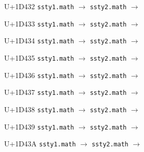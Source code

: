 \documentclass{article}
\begin{document}
\begin{substitutions}
\goodbreak

U+1D432  \linebreak
    \texttt{ssty1.math} $\to$  \linebreak
    \texttt{ssty2.math} $\to$  

\goodbreak

U+1D433  \linebreak
    \texttt{ssty1.math} $\to$  \linebreak
    \texttt{ssty2.math} $\to$  

\goodbreak

U+1D434  \linebreak
    \texttt{ssty1.math} $\to$  \linebreak
    \texttt{ssty2.math} $\to$  

\goodbreak

U+1D435  \linebreak
    \texttt{ssty1.math} $\to$  \linebreak
    \texttt{ssty2.math} $\to$  

\goodbreak

U+1D436  \linebreak
    \texttt{ssty1.math} $\to$  \linebreak
    \texttt{ssty2.math} $\to$  

\goodbreak

U+1D437  \linebreak
    \texttt{ssty1.math} $\to$  \linebreak
    \texttt{ssty2.math} $\to$  

\goodbreak

U+1D438  \linebreak
    \texttt{ssty1.math} $\to$  \linebreak
    \texttt{ssty2.math} $\to$  

\goodbreak

U+1D439  \linebreak
    \texttt{ssty1.math} $\to$  \linebreak
    \texttt{ssty2.math} $\to$  

\goodbreak

U+1D43A  \linebreak
    \texttt{ssty1.math} $\to$  \linebreak
    \texttt{ssty2.math} $\to$  


\end{substitutions}
\end{document}
